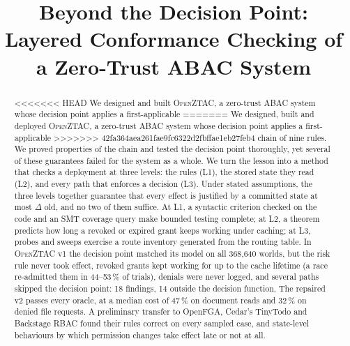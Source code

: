 \documentclass[sigconf,review,anonymous]{acmart}
\newif\ifanon
\newcommand{\sysname}{\textsc{OpenZTAC}\xspace}
\newcommand{\sysname}{\textsc{Atrium}\xspace}
\newcommand{\sysname}{\textsc{OpenZTAC}\xspace}
\begin{document}
\title[Beyond the Decision Point]{Beyond the Decision Point:\\
Layered Conformance Checking of a Zero-Trust ABAC System}

\ifanon
\author{Anonymous Author(s)}
\affiliation{\institution{Anonymous Institution}\country{}}
\else
\author{}
\fi

\begin{abstract}
<<<<<<< HEAD
We designed and built \sysname, a zero-trust ABAC system whose decision point applies a first-applicable
=======
We designed, built and deployed \sysname, a zero-trust ABAC system whose decision point applies a first-applicable
>>>>>>> 42fa364aea261fae9fc6322d2fbffae1eb27feb4
chain of nine rules. We proved properties of the chain and tested the decision point thoroughly, yet several of
these guarantees failed for the system as a whole. We turn the lesson into a method that checks a deployment at
three levels: the rules (L1), the stored state they read (L2), and every path that enforces a decision (L3). Under
stated assumptions, the three levels together guarantee that every effect is justified by a committed state at most
$\Delta$ old, and no two of them suffice. At L1, a syntactic criterion checked on the code and an SMT coverage query
make bounded testing complete; at L2, a theorem predicts how long a revoked or expired grant keeps working under
caching; at L3, probes and sweeps exercise a route inventory generated from the routing table. In \sysname v1 the
decision point matched its model on all 368{,}640 worlds, but the risk rule never took effect, revoked grants kept
working for up to the cache lifetime (a race re-admitted them in 44--53\,\% of trials), denials were never logged,
and several paths skipped the decision point: 18 findings, 14 outside the decision function. The repaired v2
passes every oracle, at a median cost of 47\,\% on document reads and 32\,\% on denied file requests. A preliminary
transfer to OpenFGA, Cedar's TinyTodo and Backstage RBAC found their rules correct on every sampled case, and
state-level behaviours by which permission changes take effect late or not at all.
\end{abstract}


\end{document}
